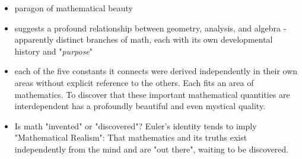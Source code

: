 \begin{frame}
\begin{itemize}
\item paragon of mathematical beauty

\item  suggests a profound relationship between geometry, analysis, and algebra - apparently distinct branches of math, each with its own developmental history and "\textit{purpose}"

\item  each of the five constants it connects were derived independently in their own areas without explicit reference to the others. Each fits an area of mathematics. To discover that these important mathematical quantities are interdependent has a profoundly beautiful and even mystical quality.

\item Is math "invented" or "discovered"? Euler's identity tends to imply "Mathematical Realism": That mathematics and its truths exist independently from the mind and are "out there", waiting to be discovered. 
\end{itemize}

\end{frame}
